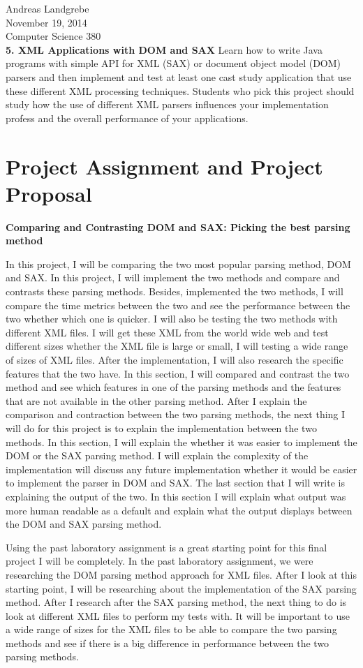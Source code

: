 \documentclass{article}
\begin{document}
\noindent
Andreas Landgrebe
\\
November 19, 2014
\\
Computer Science 380
\\
\textbf{5. XML Applications with DOM and SAX}
Learn how to write Java programs with simple API for XML (SAX) or document object model (DOM) parsers and then implement and test at least one cast study application that use these different XML processing techniques. Students who pick this project should study how the use of different XML parsers influences your implementation profess and the overall performance of your applications.
\section{Project Assignment and Project Proposal}
\textbf{Comparing and Contrasting DOM and SAX: Picking the best parsing method}
\par
\indent
In this project, I will be comparing the two most popular parsing method, DOM and SAX. In this project, I will implement the two methods and compare and contrasts these parsing methods. Besides, implemented the two methods, I will compare the time metrics between the two and see the performance between the two whether which one is quicker. I will also be testing the two methods with different XML files. I will get these XML from the world wide web and test different sizes whether the XML file is large or small, I will testing a wide range of sizes of XML files. After the implementation, I will also research the specific features that the two have. In this section, I will compared and contrast the two method and see which features in one of the parsing methods and the features that are not available in the other parsing method. After I explain the comparison and contraction between the two parsing methods, the next thing I will do for this project is to explain the implementation between the two methods. In this section, I will explain the whether it was easier to implement the DOM or the SAX parsing method. I will explain the complexity of the implementation will discuss any future implementation whether it would be easier to implement the parser in DOM and SAX. The last section that I will write is explaining the output of the two. In this section I will explain what output was more human readable as a default and explain what the output displays between the DOM and SAX parsing method.
\par
\indent
Using the past laboratory assignment is a great starting point for this final project I will be completely. In the past laboratory assignment, we were researching the DOM parsing method approach for XML files. After I look at this starting point, I will be researching about the implementation of the SAX parsing method. After I research after the SAX parsing method, the next thing to do is look at different XML files to perform my tests with. It will be important to use a wide range of sizes for the XML files to be able to compare the two parsing methods and see if there is a big difference in performance between the two parsing methods.
\end{document}
